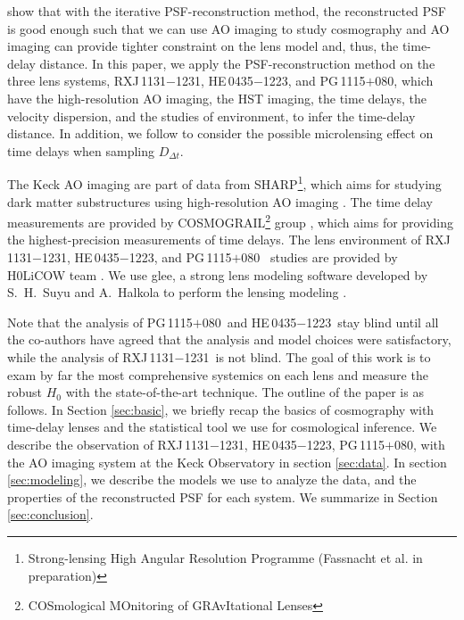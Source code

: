 \documentclass[useAMS,usenatbib]{mnras}
\newcommand\rxj{RXJ\,1131$-$1231}
\newcommand\he{HE\,0435$-$1223}
\newcommand\pg{PG\,1115$+$080}
\newcommand{\Ddt}{{D_{\Delta t}}}
\begin{document}
\citet{GChenEtal16} show that with the iterative PSF-reconstruction method, the reconstructed PSF is good enough such that we can use AO imaging to study cosmography and AO imaging can provide tighter constraint on the lens model and, thus, the time-delay distance. 
In this paper, we apply the PSF-reconstruction method on the three lens systems, \rxj, \he, and \pg, which have the high-resolution AO imaging, the HST imaging, the time delays, the velocity dispersion, and the studies of environment, to infer the time-delay distance.  In addition, we follow \citet{GChenEtal18a} to consider the possible microlensing effect on time delays when sampling $\Ddt$. 

The Keck AO imaging are part of data from SHARP\footnote{Strong-lensing High Angular Resolution Programme (Fassnacht et al. in preparation)}, which aims for studying dark matter substructures using high-resolution AO imaging \citep[e.g.,][]{Lagattuta10,Lagattuta12,Vegetti12,Hsueh16,HsuehEtal17_Illustris,HsuehEtal17_edgeon}.
The time delay measurements are provided by COSMOGRAIL\footnote{COSmological MOnitoring of GRAvItational Lenses} group \citep[e.g.,][]{CourbinEtal05,VuissozEtal07,VuissozEtal08,CourbinEtal11,TewesEtal13b,TewesEtal13a,RathnaEtal13,BonvinEtal17}, which aims for providing the highest-precision measurements of time delays. The lens environment of \rxj, \he, and \pg~ studies are provided by H0LiCOW team \citep{SuyuEtal14,SluseEtal17,RusuEtal17}. We use {\sc glee}, a strong lens modeling software developed by S.~H.~Suyu and A.~Halkola to perform the lensing modeling \citep{SuyuHalkola10,SuyuEtal12a}.

Note that the analysis of \pg~and \he~stay blind until all the co-authors have agreed that the analysis and model choices were satisfactory, while the analysis of \rxj~is not blind. The goal of this work is to exam by far the most comprehensive systemics on each lens and measure the robust $H_{0}$ with the state-of-the-art technique. The outline of the paper is as follows. In Section \ref{sec:basic}, we briefly recap the basics of cosmography with time-delay lenses and the statistical tool we use for cosmological inference. We describe the observation of \rxj, \he, \pg, with the AO imaging system at the Keck Observatory in section \ref{sec:data}. In section \ref{sec:modeling}, we describe the models we use to analyze the data, and the properties of the reconstructed PSF for each system. We summarize in Section \ref{sec:conclusion}.
\end{document}
